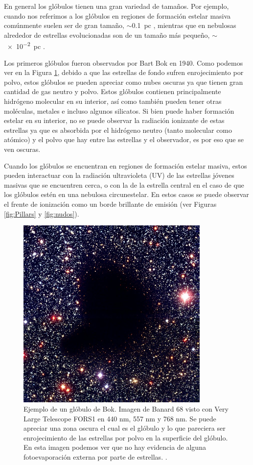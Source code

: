 \documentclass{book}
\begin{document}
En general los glóbulos tienen una gran variedad de tamaños. Por ejemplo, cuando nos referimos a los glóbulos en regiones de formación estelar masiva comúnmente suelen ser de gran tamaño, $\sim$\SI{0.1}{pc} \citep{Schenider:2016}, mientras que en nebulosas alrededor de estrellas evolucionadas son de un tamaño más pequeño, $\sim$\SI{e-2}{pc} \citep{GFGahm:2013}.

Los primeros glóbulos fueron observados por Bart Bok en 1940. Como podemos ver en la Figura \ref{fig:Banard}, debido a que las estrellas de fondo sufren enrojecimiento por polvo, estos glóbulos se pueden apreciar como nubes oscuras ya que tienen gran cantidad de gas neutro y polvo. Estos glóbulos contienen principalmente hidrógeno molecular en su interior, así como también pueden tener otras moléculas, metales e incluso algunos silicatos. Si bien puede haber formación estelar en su interior, no se puede observar la radiación ionizante de estas estrellas ya que es absorbida por el hidrógeno neutro (tanto molecular como atómico) y el polvo que hay entre las estrellas y el observador, es por eso que se ven oscuras.

Cuando los glóbulos se encuentran en regiones de formación estelar masiva, estos pueden interactuar con la radiación ultravioleta (UV) de las estrellas jóvenes masivas que se encuentren cerca, o con la de la estrella central en el caso de que los glóbulos estén en una nebulosa circunestelar. En estos casos se puede observar el frente de ionización como un borde brillante de emisión (ver Figuras \ref{fig:Pillars} y \ref{fig:nudos}).

\begin{figure}[htb]
    \centering
    \includegraphics[width=0.85\textwidth]{images Chapter 1/C1_Bok_globule.jpg}
    \caption{Ejemplo de un glóbulo de Bok. Imagen de Banard 68 visto con Very Large Telescope FORS1 en 440 nm, 557 nm y 768 nm. Se puede apreciar una zona oscura el cual es el glóbulo y lo que pareciera ser enrojecimiento de las estrellas por polvo en la superficie del glóbulo. En esta imagen podemos ver que no hay evidencia de alguna fotoevaporación externa por parte de estrellas. \citep{Alves:2001}.}
    \label{fig:Banard}
\end{figure}
\end{document}
